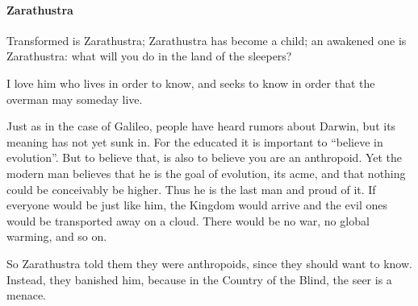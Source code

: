 \paragraph{Zarathustra}
\begin{quotex}
Transformed is Zarathustra; Zarathustra has become a child; an awakened one is Zarathustra: what will you do in the land
of the sleepers?

I love him who lives in order to know, and seeks to know in order that the overman may someday live. 

\end{quotex}
Just as in the case of Galileo, people have heard rumors about Darwin, but its meaning has not yet sunk in. For the
educated it is important to “believe in evolution”. But to believe that, is also to believe you are an anthropoid. Yet
the modern man believes that he is the goal of evolution, its acme, and that nothing could be conceivably be higher.
Thus he is the last man and proud of it. If everyone would be just like him, the Kingdom would arrive and the evil ones
would be transported away on a cloud. There would be no war, no global warming, and so on.

So Zarathustra told them they were anthropoids, since they should want to know. Instead, they banished him, because in
the Country of the Blind, the seer is a menace.

